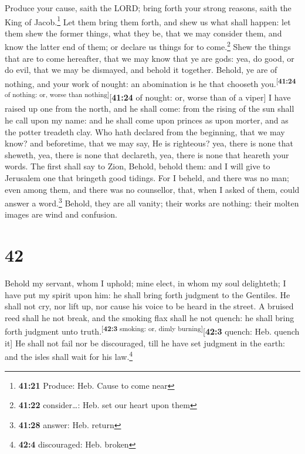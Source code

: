  Produce your cause, saith the LORD; bring forth your
strong reasons, saith the King of Jacob.\footnote{\textbf{41:21}
  Produce: Heb. Cause to come near}  Let them bring them
forth, and shew us what shall happen: let them shew the former things,
what they be, that we may consider them, and know the latter end of
them; or declare us things for to come.\footnote{\textbf{41:22}
  consider\ldots: Heb. set our heart upon them}  Shew the
things that are to come hereafter, that we may know that ye are gods:
yea, do good, or do evil, that we may be dismayed, and behold it
together.  Behold, ye are of nothing, and your work of
nought: an abomination is he that chooseth
you.\textsuperscript{{[}\textbf{41:24} of nothing: or, worse than
nothing{]}}{[}\textbf{41:24} of nought: or, worse than of a viper{]}
 I have raised up one from the north, and he shall come:
from the rising of the sun shall he call upon my name: and he shall come
upon princes as upon morter, and as the potter treadeth clay.
 Who hath declared from the beginning, that we may know?
and beforetime, that we may say, He is righteous? yea, there is none
that sheweth, yea, there is none that declareth, yea, there is none that
heareth your words.  The first shall say to Zion, Behold,
behold them: and I will give to Jerusalem one that bringeth good
tidings.  For I beheld, and there was no man; even among
them, and there was no counsellor, that, when I asked of them, could
answer a word.\footnote{\textbf{41:28} answer: Heb. return}
 Behold, they are all vanity; their works are nothing:
their molten images are wind and confusion.

\hypertarget{section-41}{%
\section{42}\label{section-41}}

 Behold my servant, whom I uphold; mine elect, in whom my
soul delighteth; I have put my spirit upon him: he shall bring forth
judgment to the Gentiles.  He shall not cry, nor lift up,
nor cause his voice to be heard in the street.  A bruised
reed shall he not break, and the smoking flax shall he not quench: he
shall bring forth judgment unto truth.\textsuperscript{{[}\textbf{42:3}
smoking: or, dimly burning{]}}{[}\textbf{42:3} quench: Heb. quench it{]}
 He shall not fail nor be discouraged, till he have set
judgment in the earth: and the isles shall wait for his law.\footnote{\textbf{42:4}
  discouraged: Heb. broken}

